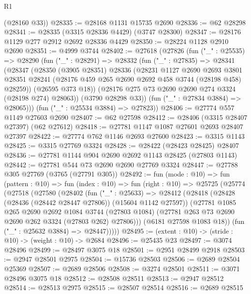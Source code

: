 \begin{lexlean}{R1}
\begin{coremodule}
      (@28160 @33))
@28335 := @28168 @1131 @15735 @2690
@28336 := @62 @28298
@28341 := @28335 (@3315 @28336 @4429) (@3747 @28300)
@28347 := @28176 @1129 @277 @2912 @2692 @28336 @4429
@28350 := @28224 @1128 @2910 @2690
@28351 := @4999 @3744
@28402 := @27618
    (@27826
      (fun ("_" : @25535) =>
      @28290
        (fun ("_" : @28291) =>
        @28332
          (fun ("_" : @27835) =>
          @28341
            (@28347
              (@28350
                (@3905 @28351)
                @28336
                (@28231
                  @1127
                  @2690
                  @2693
                  @3801
                  @28351
                  @28241
                  (@28176 @459 @265 @2690 @2692 @458 @3744 (@28198 @458) @28259))
                (@26595 @373 @18))
              (@28176 @275 @73 @2690 @2690 @274 @3324 (@28198 @274) @28063))
            (@3790 @28298 @33))
          (fun ("_" : @27834 @3884) => @28065)))
      (fun ("_" : @25534 @3884) => @27823))
@28406 := @27774 @557 @1149 @27603 @2690
@28407 := @62 @27598
@28412 := @28406 (@3315 @28407 @27397) (@62 @27612)
@28418 := @27781 @1147 @1087 @27601 @2693 @28407 @27397
@28422 := @27774 @762 @1146 @2693 @27600
@28423 := @3315 @1143
@28425 := @3315 @27769 @3324
@28428 := @28422 (@28423 @28425) @28407
@28436 := @27781 @1144 @904 @2690 @2692 @1143 @28425 (@27803 @1143)
@28442 := @27781 @544 @73 @2690 @2690 @27769 @3324
@28447 := @27788 @305 @27769 (@3765 (@27791 @305))
@28492 := fun (mode : @10) =>
  fun (pattern : @10) =>
  fun (index : @10) =>
  fun (right : @10) =>
  @25725
    (@25774
      (@27518
        (@27580
          (@28402
            (fun ("_" : @25633) =>
            @28412
              (@28418
                (@28428 (@28436 (@28442 @28447 @27806)) (@15604 @1142 @27597))
                (@27781
                  @1085
                  @265
                  @2690
                  @2692
                  @1084
                  @3744
                  (@27803 @1084)
                  (@27781 @263 @73 @2690 @2690 @262 @3324 (@27803 @262) @27806)))
              (@6181 @27598 @1083 @18))
            (fun ("_" : @25632 @3884) => @28447)))))
@28495 := (extent : @10) -> (stride : @10) -> (weight : @10) -> @2684
@28496 := @25435 @23
@28497 := @3074 @28496
@28499 := @28497 @3075 @18
@28501 := @2951 @28499 @2918
@28503 := @2947 @28501 @2975
@28504 := @15736 @28503
@28506 := @2689 @28504 @25369
@28507 := @2689 @28506
@28508 := @3274 @28501
@28511 := @3071 @28496 @3075 @18
@28512 := @28508 @28511
@28513 := @2947 @28512
@28514 := @28513 @2975
@28515 := @28507 @28514
@28516 := @2689 @28515

\end{coremodule}
\end{lexlean}

